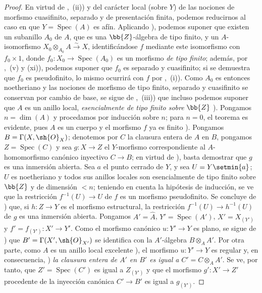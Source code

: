 \begin{proof}
En virtud de ,~(ii)) y del carácter local (sobre $Y$) de las nociones de morfismo cuasifinito, separado y de presentación finita, podemos reducirnos al caso en que $Y=\operatorname{Spec}(A)$ es afín.
Aplicando ), podemos suponer que existen un subanillo $A_0$ de $A$, que es una $\bb{Z}$-álgebra de tipo finito, y un $A$-isomorfismo $X_0\otimes_{A_0}A\xrightarrow{\sim}X$, identificándose $f$ mediante este isomorfismo con $f_0\times 1$, donde $f_0:X_0\to\operatorname{Spec}(A_0)$ es un morfismo \emph{de tipo finito}; además, por ,~(v) y (xi)), podemos suponer que $f_0$ es separado y cuasifinito; si se demuestra que $f_0$ es pseudofinito, lo mismo ocurrirá con $f$ por ,~(i)).
Como $A_0$ es entonces noetheriano y las nociones de morfismo de tipo finito, separado y cuasifinito se conservan por cambio de base, se sigue de ,~(iii)) que incluso podemos suponer que $A$ es un anillo local, \emph{esencialmente de tipo finito sobre} $\bb{Z}$ ).
Pongamos $n=\dim(A)$ y procedamos por inducción sobre $n$; para $n=0$, el teorema es evidente, pues $A$ es un cuerpo y el morfismo $f$ ya es finito ).
Pongamos $B=\Gamma(X,\sh{O}_X)$; denotemos por $C$ la clausura entera de $A$ en $B$, pongamos $Z=\operatorname{Spec}(C)$ y sea $g:X\to Z$ el $Y$-morfismo correspondiente al $A$-homomorfismo canónico inyectivo $C\to B$; en virtud de ), basta demostrar que $g$ es una inmersión abierta.
Sea $a$ el punto cerrado de $Y$, y sea $U=Y\setmin\{a\}$; $U$ es noetheriano y todos sus anillos locales son esencialmente de tipo finito sobre $\bb{Z}$ y de dimensión $<n$; teniendo en cuenta la hipótesis de inducción, se ve que la restricción $f^{-1}(U)\to U$ de $f$ es un morfismo pseudofinito.
Se concluye de ) que, si $h:Z\to Y$ es el morfismo estructural, la restricción $f^{-1}(U)\to h^{-1}(U)$ de $g$ es una inmersión abierta.
Pongamos $A'=\hat{A}$, $Y'=\operatorname{Spec}(A')$, $X'=X_{(Y')}$ y $f'=f_{(Y')}:X'\to Y'$.
Como el morfismo canónico $u:Y'\to Y$ es plano, se sigue de ) que $B'=\Gamma(X',\sh{O}_{X'})$ se identifica con la $A'$-álgebra $B\otimes_A A'$.
Por otra parte, como $A$ es un anillo local excelente ), el morfismo $u:Y'\to Y$ es regular y, en consecuencia, ) \emph{la clausura entera de $A'$ en $B'$ es igual a} $C'=C\otimes_A A'$.
Se ve, por tanto, que $Z'=\operatorname{Spec}(C')$ es igual a $Z_{(Y')}$ y que el morfismo $g':X'\to Z'$ procedente de la inyección canónica $C'\to B'$ es igual a $g_{(Y')}$.

\end{proof}
